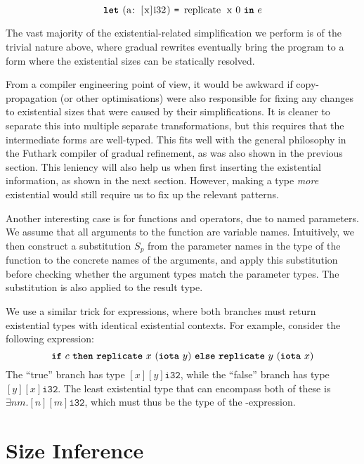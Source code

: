 \[
\Let{\mbox{\lstinline{(a: [x]i32)}}}{\mbox{\lstinline{replicate x 0}}}{e}
\]

The vast majority of the existential-related simplification we perform
is of the trivial nature above, where gradual rewrites eventually
bring the program to a form where the existential sizes can be
statically resolved.

From a compiler engineering point of view, it would be awkward if
copy-propagation (or other optimisations) were also responsible for
fixing any changes to existential sizes that were caused by their
simplifications.  It is cleaner to separate this into multiple
separate transformations, but this requires that the intermediate
forms are well-typed.  This fits well with the general philosophy in
the Futhark compiler of gradual refinement, as was also shown in the
previous section.  This leniency will also help us when first
inserting the existential information, as shown in the next section.
However, making a type \textit{more} existential would still require
us to fix up the relevant patterns.

Another interesting case is for functions and operators, due to named
parameters.  We assume that all arguments to the function are variable
names.  Intuitively, we then construct a substitution $S_{p}$ from the
parameter names in the type of the function to the concrete names of
the arguments, and apply this substitution before checking whether the
argument types match the parameter types.  The substitution is also
applied to the result type.

We use a similar trick for  expressions, where both branches
must return existential types with identical existential contexts.
For example, consider the following expression:
\[
  \mbox{\texttt{\bfseries{if}}}~c~\mbox{\texttt{\bfseries{then}}}~\mbox{\texttt{\bfseries{replicate}}}~x~(\mbox{\texttt{\bfseries{iota}}}~y)~\mbox{\texttt{\bfseries{else}}}~\mbox{\texttt{\bfseries{replicate}}}~y~(\mbox{\texttt{\bfseries{iota}}}~x)
\]
The ``true'' branch has type $[x][y]\texttt{i32}$, while the ``false''
branch has type $[y][x]\texttt{i32}$.  The least existential type that
can encompass both of these is $\exists n m.[n][m]\texttt{i32}$, which
must thus be the type of the -expression.

\section{Size Inference}
\label{sec:size-inference}

\newcommand{\transformBnd}[1]{\mathcal{A}_{#1}^{\text{exp}}}
\newcommand{\transformFun}{\mathcal{A}^{\text{fun}}}
\newcommand{\transformLam}[1]{\mathcal{A}_{#1}^{\text{lam}}}
\newcommand{\head}{\textrm{head}}
\newcommand{\tail}{\textrm{tail}}
\newcommand{\drop}{\textrm{drop}}
\newcommand{\cons}[2]{#1 :: #2}

